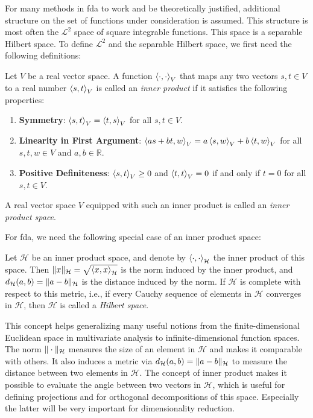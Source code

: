 For many methods in fda to work and be theoretically justified, additional structure on
the set of functions under consideration is assumed. This structure is most often the
$\mathcal{L}^2$ space of square integrable functions. This space is a separable Hilbert
space. To define $\mathcal{L}^2$ and the separable Hilbert space, we first need the
following definitions:

\begin{definition}
    Let \( V \) be a real vector space. A function $\left \langle \cdot, \cdot \right \rangle_V$ that maps any
    two vectors \( s, t \in V \) to a real number \( \left \langle s, t \right \rangle_V \) is called an
    \textit{inner product} if it satisfies the following properties:
    \begin{enumerate}
        \item \textbf{Symmetry}: \( \left \langle s, t \right \rangle_V  = \left \langle t, s \right \rangle_V \) for all \( s, t \in V \).
        \item \textbf{Linearity in First Argument}: \( \left \langle as + bt, w \right \rangle_V = a \left \langle s, w \right \rangle_V + b \left \langle t, w \right \rangle_V \) for all \( s, t, w \in V \) and \( a, b \in \mathbb{R} \).
        \item \textbf{Positive Definiteness}: \( \left \langle s, t \right \rangle_V \geq 0 \) and \( \left \langle t, t \right \rangle_V = 0 \) if and only if \( t = 0 \) for all \( s, t \in V \).
    \end{enumerate}
    A real vector space \( V \) equipped with such an inner product is called an
    \textit{inner product space}.
\end{definition}

For fda, we need the following special case of an inner product space:
\begin{definition}
    Let $\mathcal{H}$ be an inner product space, and denote by $\left \langle \cdot, \cdot \right \rangle_\mathcal{H}$
    the inner product of this space. Then $\|x\|_\mathcal{H} = \sqrt{\left \langle x, x \right \rangle_\mathcal{H}}$
    is the norm induced by the inner product, and $d_\mathcal{H}(a, b) = \|a - b\|_\mathcal{H}$
    is the distance induced by the norm. If $\mathcal{H}$ is complete with respect
    to this metric, i.e., if every Cauchy sequence of elements in $\mathcal{H}$ converges
    in $\mathcal{H}$, then $\mathcal{H}$ is called a \textit{Hilbert space}.
\end{definition}
This concept helps generalizing many useful notions from the finite-dimensional
Euclidean space in multivariate analysis to infinite-dimensional function spaces. The norm
$\|\cdot\|_\mathcal{H}$ measures the size of an element in $\mathcal{H}$ and makes it
comparable with others. It also induces a metric via
$d_\mathcal{H}(a, b) = \|a - b\|_\mathcal{H}$ to measure the distance between two
elements in $\mathcal{H}$. The concept of inner product makes it possible to evaluate
the angle between two vectors in $\mathcal{H}$, which is useful for defining projections
and for orthogonal decompositions of this space. Especially the latter will be very
important for dimensionality reduction.

